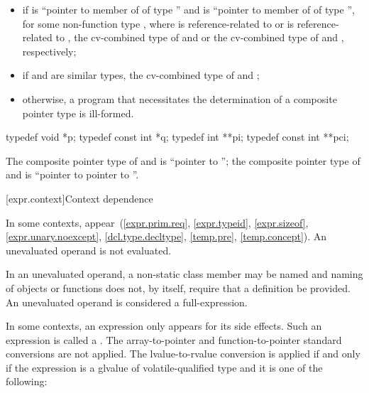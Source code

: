 \begin{itemize}
\item
if  is
``pointer to member of  of type  '' and
 is
``pointer to member of  of type  '',
for some non-function type ,
where  is
reference-related to  or  is reference-related to
, the cv-combined type of  and  or the cv-combined type
of  and , respectively;

\item
if  and  are similar types, the cv-combined type of  and
;

\item
otherwise, a program that necessitates the determination of a
composite pointer type is ill-formed.
\end{itemize}

\begin{example}
\begin{codeblock}
typedef void *p;
typedef const int *q;
typedef int **pi;
typedef const int **pci;
\end{codeblock}

The composite pointer type of  and  is ``pointer to ''; the
composite pointer type of  and  is ``pointer to  pointer to
''.
\end{example}

[expr.context]{Context dependence}

\pnum
In some contexts, 
appear~(\ref{expr.prim.req},
\ref{expr.typeid},
\ref{expr.sizeof},
\ref{expr.unary.noexcept},
\ref{dcl.type.decltype},
\ref{temp.pre},
\ref{temp.concept}).
An unevaluated operand is not evaluated.
\begin{note}
In an unevaluated operand, a non-static class member may be
named and naming of objects or functions does not, by
itself, require that a definition be provided.
An unevaluated operand is considered a full-expression.
\end{note}

\pnum
In some contexts, an expression only appears for its side effects. Such an
expression is called a .
The array-to-pointer
and function-to-pointer standard conversions are not
applied. The lvalue-to-rvalue conversion is applied
if and only if
the expression is a glvalue of volatile-qualified type and it is one of the
following:

